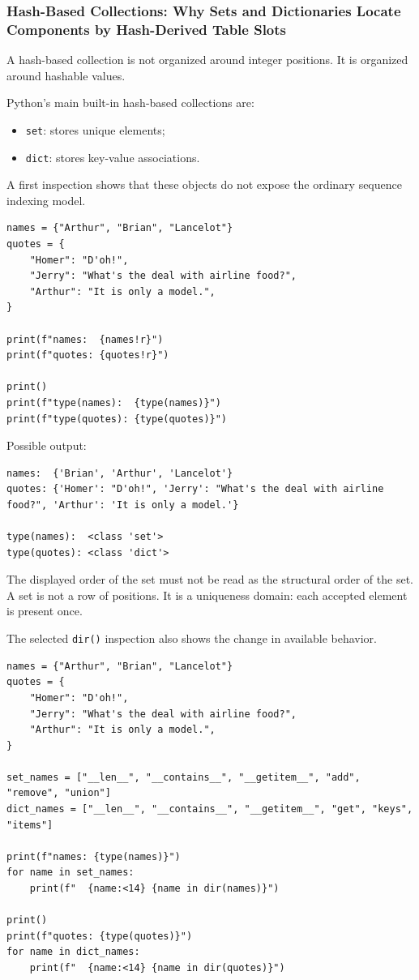 \subsubsection{Hash-Based Collections: Why Sets and Dictionaries Locate Components by Hash-Derived Table Slots}

A hash-based collection is not organized around integer positions. It is organized around hashable values.

Python's main built-in hash-based collections are:

\begin{itemize}
    \item \texttt{set}: stores unique elements;
    \item \texttt{dict}: stores key-value associations.
\end{itemize}

A first inspection shows that these objects do not expose the ordinary sequence indexing model.

\begin{verbatim}
names = {"Arthur", "Brian", "Lancelot"}
quotes = {
    "Homer": "D'oh!",
    "Jerry": "What's the deal with airline food?",
    "Arthur": "It is only a model.",
}

print(f"names:  {names!r}")
print(f"quotes: {quotes!r}")

print()
print(f"type(names):  {type(names)}")
print(f"type(quotes): {type(quotes)}")
\end{verbatim}

Possible output:

\begin{verbatim}
names:  {'Brian', 'Arthur', 'Lancelot'}
quotes: {'Homer': "D'oh!", 'Jerry': "What's the deal with airline food?", 'Arthur': 'It is only a model.'}

type(names):  <class 'set'>
type(quotes): <class 'dict'>
\end{verbatim}

The displayed order of the set must not be read as the structural order of the set. A set is not a row of positions. It is a uniqueness domain: each accepted element is present once.

The selected \texttt{dir()} inspection also shows the change in available behavior.

\begin{verbatim}
names = {"Arthur", "Brian", "Lancelot"}
quotes = {
    "Homer": "D'oh!",
    "Jerry": "What's the deal with airline food?",
    "Arthur": "It is only a model.",
}

set_names = ["__len__", "__contains__", "__getitem__", "add", "remove", "union"]
dict_names = ["__len__", "__contains__", "__getitem__", "get", "keys", "items"]

print(f"names: {type(names)}")
for name in set_names:
    print(f"  {name:<14} {name in dir(names)}")

print()
print(f"quotes: {type(quotes)}")
for name in dict_names:
    print(f"  {name:<14} {name in dir(quotes)}")
\end{verbatim}

